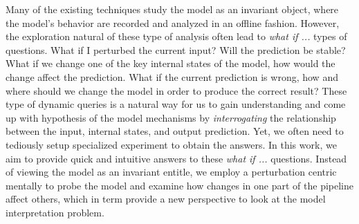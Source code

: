 Many of the existing techniques study the model as an invariant object, where the model's behavior are recorded and analyzed in an offline fashion.
%
However, the exploration natural of these type of analysis often lead to \emph{what if ...} types of questions. What if I perturbed the current input? Will the prediction be stable? What if we change one of the key internal states of the model, how would the change affect the prediction. What if the current prediction is wrong, how and where should we change the model in order to produce the correct result? These type of dynamic queries is a natural way for us to gain understanding and come up with hypothesis of the model mechanisms by \emph{interrogating} the relationship between the input, internal states, and output prediction. Yet, we often need to tediously setup specialized experiment to obtain the answers.
%
In this work, we aim to provide quick and intuitive answers to these \emph{what if ...} questions. Instead of viewing the model as an invariant entitle, we employ a perturbation centric mentally to probe the model and examine how changes in one part of the pipeline affect others, which in term provide a new perspective to look at the model interpretation problem.










%
%

